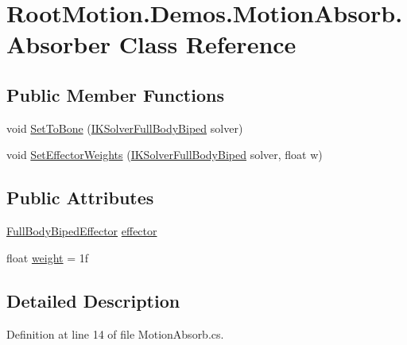 \hypertarget{class_root_motion_1_1_demos_1_1_motion_absorb_1_1_absorber}{}\section{Root\+Motion.\+Demos.\+Motion\+Absorb.\+Absorber Class Reference}
\label{class_root_motion_1_1_demos_1_1_motion_absorb_1_1_absorber}
\subsection*{Public Member Functions}
\begin{DoxyCompactItemize}
\item 
void \mbox{\hyperlink{class_root_motion_1_1_demos_1_1_motion_absorb_1_1_absorber_a94116b6b81ddbc16210faf35b7739044}{Set\+To\+Bone}} (\mbox{\hyperlink{class_root_motion_1_1_final_i_k_1_1_i_k_solver_full_body_biped}{I\+K\+Solver\+Full\+Body\+Biped}} solver)
\item 
void \mbox{\hyperlink{class_root_motion_1_1_demos_1_1_motion_absorb_1_1_absorber_ac6ac89bec9e417b32fcd8aa85f3da3b3}{Set\+Effector\+Weights}} (\mbox{\hyperlink{class_root_motion_1_1_final_i_k_1_1_i_k_solver_full_body_biped}{I\+K\+Solver\+Full\+Body\+Biped}} solver, float w)
\end{DoxyCompactItemize}
\subsection*{Public Attributes}
\begin{DoxyCompactItemize}
\item 
\mbox{\hyperlink{namespace_root_motion_1_1_final_i_k_ae0dd2058c7667b6f132c11a6b860c14a}{Full\+Body\+Biped\+Effector}} \mbox{\hyperlink{class_root_motion_1_1_demos_1_1_motion_absorb_1_1_absorber_a60ae6699ece055fff8e18c5a846bfade}{effector}}
\item 
float \mbox{\hyperlink{class_root_motion_1_1_demos_1_1_motion_absorb_1_1_absorber_ae55c2d0275c1982b873b1a0c4725a783}{weight}} = 1f
\end{DoxyCompactItemize}


\subsection{Detailed Description}


Definition at line 14 of file Motion\+Absorb.\+cs.



